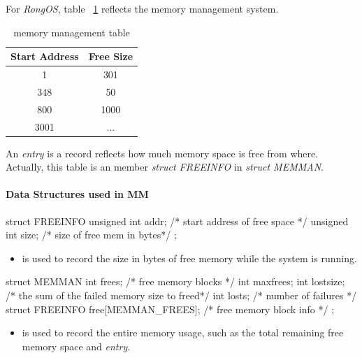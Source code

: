 \documentclass{swfcthesis}
\begin{document}
For \emph{RongOS}, table ~\ref{tab:memo-tab} reflects the memory management system.
\begin{table}[!ht]
  \centering
  \begin{tabular}{|c|c|}
    \hline
    Start Address & Free Size \\
    \hline
    1 & 301 \\
    \hline
    348 & 50 \\
    \hline
    800 & 1000 \\
    \hline
    3001 & ... \\
    \hline
  \end{tabular}
  \caption{memory management table}
  \label{tab:memo-tab}
\end{table}
An \emph{entry} is a record reflects how much memory space is free from where. Actually,
this table is an member \emph{struct FREEINFO} in \emph{struct MEMMAN}.




\paragraph{Data Structures used in MM}

\begin{codeblock}[1]
\begin{ccode}
struct FREEINFO
{ 
  unsigned int addr; /* start address of free space */
  unsigned int size; /* size of free mem in bytes*/
};
\end{ccode}
\end{codeblock}
\begin{itemize}
\item %
  is used to record the size in bytes of free memory while
  the system is running.
\end{itemize}

\begin{codeblock}[1]
\begin{ccode}
struct MEMMAN
{ 
  int frees;    /* free memory blocks */
  int maxfrees; 
  int lostsize; /* the sum of the failed memory size to freed*/
  int losts;    /* number of failures */
  struct FREEINFO free[MEMMAN_FREES]; /* free memory block info */
};
\end{ccode}
\end{codeblock}
\begin{itemize}
\item is used to record the entire
  memory usage, such as the total remaining free memory space and \emph{entry}.
\end{itemize}
\end{document}
